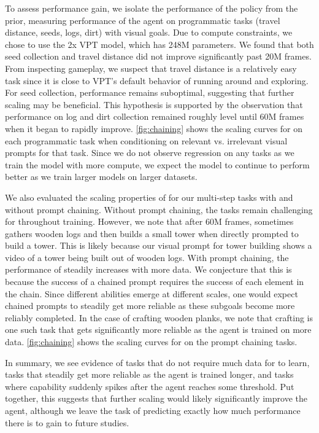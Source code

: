 To assess performance gain, we isolate the performance of the policy from the prior, measuring performance of the agent on programmatic tasks (travel distance, seeds, logs, dirt) with visual goals. Due to compute constraints, we chose to use the 2x VPT model, which has 248M parameters. We found that both seed collection and travel distance did not improve significantly past 20M frames. From inspecting gameplay, we suspect that travel distance is a relatively easy task since it is close to VPT's default behavior of running around and exploring. For seed collection, performance remains suboptimal, suggesting that further scaling may be beneficial. This hypothesis is supported by the observation that performance on log and dirt collection remained roughly level until 60M frames when it began to rapidly improve. \autoref{fig:chaining} shows the scaling curves for \agentname{} on each programmatic task when conditioning on relevant vs. irrelevant visual prompts for that task. Since we do not observe regression on any tasks as we train the model with more compute, we expect the model to continue to perform better as we train larger models on larger datasets.

We also evaluated the scaling properties of \agentname{} for our multi-step tasks with and without prompt chaining. Without prompt chaining, the tasks remain challenging for \agentname{} throughout training. However, we note that after 60M frames, \agentname{} sometimes gathers wooden logs and then builds a small tower when directly prompted to build a tower. This is likely because our visual prompt for tower building shows a video of a tower being built out of wooden logs. With prompt chaining, the performance of \agentname{} steadily increases with more data. We conjecture that this is because the success of a chained prompt requires the success of each element in the chain. Since different abilities emerge at different scales, one would expect chained prompts to steadily get more reliable as these subgoals become more reliably completed. In the case of crafting wooden planks, we note that crafting is one such task that gets significantly more reliable as the agent is trained on more data. \autoref{fig:chaining} shows the scaling curves for \agentname{} on the prompt chaining tasks.

In summary, we see evidence of tasks that do not require much data for \agentname{} to learn, tasks that steadily get more reliable as the agent is trained longer, and tasks where capability suddenly spikes after the agent reaches some threshold. Put together, this suggests that further scaling would likely significantly improve the agent, although we leave the task of predicting exactly how much performance there is to gain to future studies.

